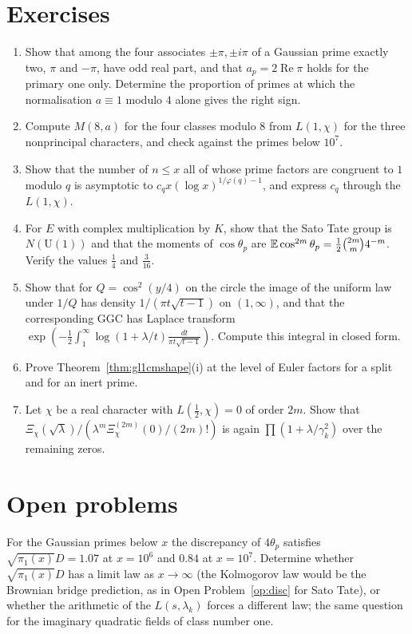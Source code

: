 \section{Exercises}

\begin{enumerate}
\item Show that among the four associates $\pm\pi,\pm i\pi$ of a Gaussian prime exactly two, $\pi$ and $-\pi$, have odd real part, and that $a_p=2\operatorname{Re}\pi$ holds for the primary one only. Determine the proportion of primes at which the normalisation $a\equiv1$ modulo $4$ alone gives the right sign.
\item Compute $M(8,a)$ for the four classes modulo $8$ from $L(1,\chi)$ for the three nonprincipal characters, and check against the primes below $10^7$.
\item Show that the number of $n\le x$ all of whose prime factors are congruent to $1$ modulo $q$ is asymptotic to $c_qx(\log x)^{1/\varphi(q)-1}$, and express $c_q$ through the $L(1,\chi)$.
\item For $E$ with complex multiplication by $K$, show that the Sato Tate group is $N(\mathrm{U}(1))$ and that the moments of $\cos\theta_p$ are $\mathbb{E}\cos^{2m}\theta_p=\frac12\binom{2m}m4^{-m}$. Verify the values $\frac14$ and $\frac3{16}$.
\item Show that for $Q=\cos^2(y/4)$ on the circle the image of the uniform law under $1/Q$ has density $1/(\pi t\sqrt{t-1})$ on $(1,\infty)$, and that the corresponding GGC has Laplace transform $\exp(-\frac12\int_1^\infty\log(1+\lambda/t)\frac{dt}{\pi t\sqrt{t-1}})$. Compute this integral in closed form.
\item Prove Theorem~\ref{thm:gl1cmshape}(i) at the level of Euler factors for a split and for an inert prime.
\item Let $\chi$ be a real character with $L(\frac12,\chi)=0$ of order $2m$. Show that $\Xi_\chi(\sqrt\lambda)/(\lambda^m\Xi_\chi^{(2m)}(0)/(2m)!)$ is again $\prod(1+\lambda/\gamma_k^2)$ over the remaining zeros.
\end{enumerate}

\section{Open problems}

\begin{problem}\label{op:gl1disc}
For the Gaussian primes below $x$ the discrepancy of $4\theta_p$ satisfies $\sqrt{\pi_1(x)}D=1.07$ at $x=10^6$ and $0.84$ at $x=10^7$. Determine whether $\sqrt{\pi_1(x)}D$ has a limit law as $x\to\infty$ (the Kolmogorov law would be the Brownian bridge prediction, as in Open Problem~\ref{op:disc} for Sato Tate), or whether the arithmetic of the $L(s,\lambda_k)$ forces a different law; the same question for the imaginary quadratic fields of class number one.
\end{problem}

